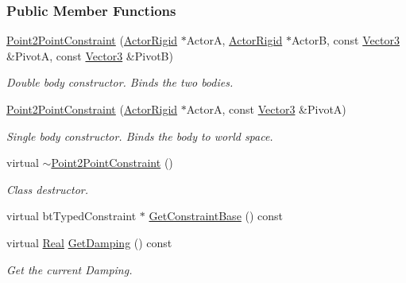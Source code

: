 \subsubsection*{Public Member Functions}
\begin{DoxyCompactItemize}
\item 
\hyperlink{classMezzanine_1_1Point2PointConstraint_a216daa575bd4dc2589875ca24a97faa8}{Point2PointConstraint} (\hyperlink{classMezzanine_1_1ActorRigid}{ActorRigid} $\ast$ActorA, \hyperlink{classMezzanine_1_1ActorRigid}{ActorRigid} $\ast$ActorB, const \hyperlink{classMezzanine_1_1Vector3}{Vector3} \&PivotA, const \hyperlink{classMezzanine_1_1Vector3}{Vector3} \&PivotB)
\begin{DoxyCompactList}\small\item\em Double body constructor. Binds the two bodies. \item\end{DoxyCompactList}\item 
\hyperlink{classMezzanine_1_1Point2PointConstraint_a62ddd5588e4b7c95892eca8486cea099}{Point2PointConstraint} (\hyperlink{classMezzanine_1_1ActorRigid}{ActorRigid} $\ast$ActorA, const \hyperlink{classMezzanine_1_1Vector3}{Vector3} \&PivotA)
\begin{DoxyCompactList}\small\item\em Single body constructor. Binds the body to world space. \item\end{DoxyCompactList}\item 
virtual \hyperlink{classMezzanine_1_1Point2PointConstraint_a9a928ba39d2b8f9887d981afd8f776aa}{$\sim$Point2PointConstraint} ()
\begin{DoxyCompactList}\small\item\em Class destructor. \item\end{DoxyCompactList}\item 
virtual btTypedConstraint $\ast$ \hyperlink{classMezzanine_1_1Point2PointConstraint_a99f25e594a55a5c84db10981c30ffd60}{GetConstraintBase} () const 
\item 
virtual \hyperlink{namespaceMezzanine_a726731b1a7df72bf3583e4a97282c6f6}{Real} \hyperlink{classMezzanine_1_1Point2PointConstraint_a5578b5727952e6c225a989d88380774e}{GetDamping} () const 
\begin{DoxyCompactList}\small\item\em Get the current Damping. \item\end{DoxyCompactList}\item 

\end{DoxyCompactItemize}
